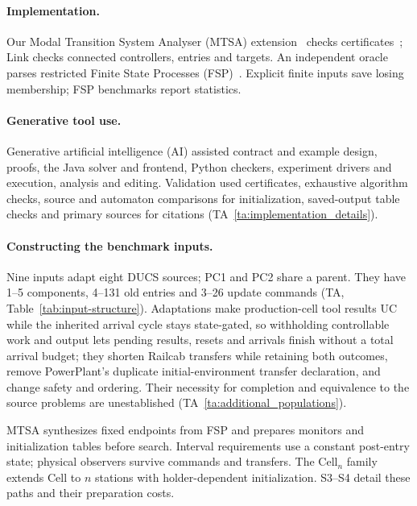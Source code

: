 \documentclass[acmsmall,screen,review,anonymous]{acmart}
\begin{document}
\paragraph{Implementation.}
Our Modal Transition System Analyser (MTSA) extension~\cite{paper:MTSA2008} checks certificates~\cite{McConnellEtAl2011Certifying}; Link checks connected controllers, entries and targets. An independent oracle parses restricted Finite State Processes (FSP)~\cite{MageeKramer2006}. Explicit finite inputs save losing membership; FSP benchmarks report statistics.

\paragraph{Generative tool use.}
Generative artificial intelligence (AI) assisted contract and example design, proofs, the Java solver and frontend, Python checkers, experiment drivers and execution, analysis and editing. Validation used certificates, exhaustive algorithm checks, source and automaton comparisons for initialization, saved-output table checks and primary sources for citations (TA~\ref{ta:implementation_details}).

\paragraph{Constructing the benchmark inputs.}
Nine inputs adapt eight DUCS sources; PC1 and PC2 share a parent. They have 1--5 components, 4--131 old entries and 3--26 update commands (TA, Table~\ref{tab:input-structure}). Adaptations make production-cell tool results UC while the inherited arrival cycle stays state-gated, so withholding controllable work and output lets pending results, resets and arrivals finish without a total arrival budget; they shorten Railcab transfers while retaining both outcomes, remove PowerPlant's duplicate initial-environment transfer declaration, and change safety and ordering. Their necessity for completion and equivalence to the source problems are unestablished (TA~\ref{ta:additional_populations}).

MTSA synthesizes fixed endpoints from FSP and prepares monitors and initialization tables before search. Interval requirements use a constant post-entry state; physical observers survive commands and transfers. The Cell$_n$ family extends Cell to $n$ stations with holder-dependent initialization. S3--S4 detail these paths and their preparation costs.

\end{document}
